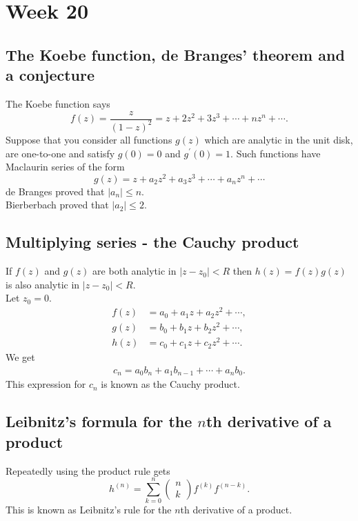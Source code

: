 \documentclass{article}
\begin{document}
\section{Week 20}
\subsection{The Koebe function, de Branges' theorem and a conjecture}
The Koebe function says
\begin{equation}
    f(z) = \frac{z}{(1-z)^2} = z + 2z^2 + 3z^3 + \cdots + nz^n + \cdots .
\end{equation}
Suppose that you consider all functions $g(z)$ which are analytic in the unit disk, are one-to-one and satisfy $g(0) = 0$ and $g^\prime(0)=1$. Such functions have Maclaurin series of the form
\begin{equation}
    g(z) = z + a_2z^2 + a_3z^3 + \cdots + a_nz^n + \cdots
\end{equation}
de Branges proved that $\vert a_n\vert\leq n$. \\
Bierberbach proved that $\vert a_2\vert\leq 2$.


\subsection{Multiplying series - the Cauchy product}
If $f(z)$ and $g(z)$ are both analytic in $\vert z-z_0\vert<R$ then $h(z)=f(z)g(z)$ is also analytic in $\vert z-z_0\vert<R$.\\
Let $z_0=0$.
\begin{align}
    f(z) &= a_0 + a_1z + a_2z^2 + \cdots, \\
    g(z) &= b_0 + b_1z + b_2z^2 + \cdots, \\
    h(z) &= c_0 + c_1z + c_2z^2 + \cdots.
\end{align}
We get
\begin{align}
    c_n = a_0b_n + a_1b_{n-1} + \cdots + a_nb_0.
\end{align}
This expression for $c_n$ is known as the Cauchy product.

\subsection{Leibnitz's formula for the $n$th derivative of a product}
Repeatedly using the product rule gets
\begin{equation}
    h^{(n)} = \sum_{k=0}^n\begin{pmatrix} n \\ k \end{pmatrix}f^{(k)}f^{(n-k)}.
\end{equation}
This is known as Leibnitz's rule for the $n$th derivative of a product.
\end{document}
